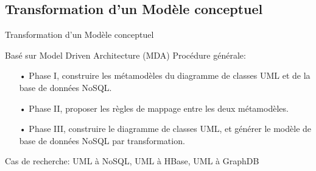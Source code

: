 \documentclass[xcolor=dvipsnames]{beamer}
\begin{document}
\subsection{Transformation d’un Modèle conceptuel}
\begin{frame}{Transformation d’un Modèle conceptuel}
	\begin{block}{Basé sur Model Driven Architecture (MDA)}
	Procédure générale:
	\begin{itemize}
		\item[•] Phase I, construire les métamodèles du diagramme de classes UML et de la base de données NoSQL.
		\item[•] Phase II, proposer les règles de mappage entre les deux métamodèles.
		\item[•] Phase III, construire le diagramme de classes UML, et générer le modèle de base de données NoSQL par transformation.
	\end{itemize}
	Cas de recherche:
	UML à NoSQL, UML à HBase, UML à GraphDB
\end{block}
\end{frame}
\end{document}
